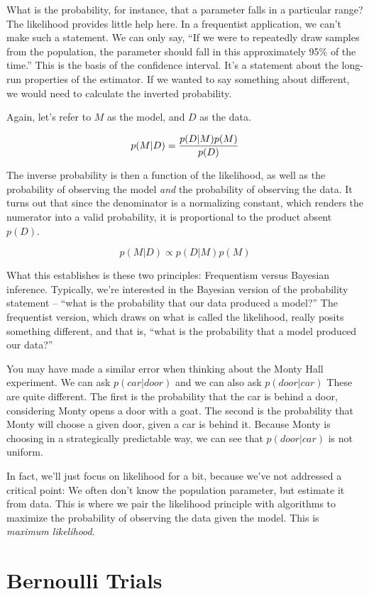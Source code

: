 \documentclass[
]{book}
\begin{document}
What is the probability, for instance, that a parameter falls in a particular range? The likelihood provides little help here. In a frequentist application, we can't make such a statement. We can only say, ``If we were to repeatedly draw samples from the population, the parameter should fall in this approximately 95\% of the time.'' This is the basis of the confidence interval. It's a statement about the long-run properties of the estimator. If we wanted to say something about different, we would need to calculate the inverted probability.

Again, let's refer to \(M\) as the model, and \(D\) as the data.

\[p(M|D) ={p(D|M) p(M)\over p(D)}\]

The inverse probability is then a function of the likelihood, as well as the probability of observing the model \emph{and} the probability of observing the data. It turns out that since the denominator is a normalizing constant, which renders the numerator into a valid probability, it is proportional to the product absent \(p(D)\).

\[p(M|D) \propto p(D|M) p(M)\]

What this establishes is these two principles: Frequentism versus Bayesian inference. Typically, we're interested in the Bayesian version of the probability statement -- ``what is the probability that our data produced a model?'' The frequentist version, which draws on what is called the likelihood, really posits something different, and that is, ``what is the probability that a model produced our data?''

You may have made a similar error when thinking about the Monty Hall experiment. We can ask \(p(car|door)\) and we can also ask \(p(door|car)\) These are quite different. The first is the probability that the car is behind a door, considering Monty opens a door with a goat. The second is the probability that Monty will choose a given door, given a car is behind it. Because Monty is choosing in a strategically predictable way, we can see that \(p(door|car)\) is not uniform.

In fact, we'll just focus on likelihood for a bit, because we've not addressed a critical point: We often don't know the population parameter, but estimate it from data. This is where we pair the likelihood principle with algorithms to maximize the probability of observing the data given the model. This is \emph{maximum likelihood}.

\section{Bernoulli Trials}\label{bernoulli-trials}
\end{document}
